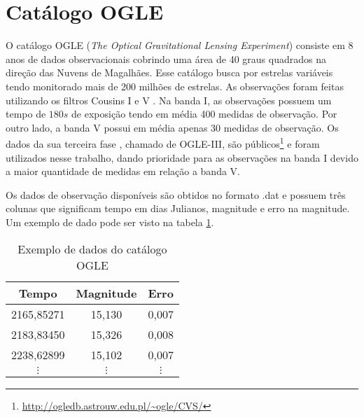 

\section{Catálogo OGLE}

O catálogo OGLE (\textit{The Optical Gravitational Lensing Experiment}) \citep{Udalski2008} consiste em 8 anos de dados observacionais cobrindo uma área de 40 graus quadrados na direção das Nuvens de Magalhães. Esse catálogo busca por estrelas variáveis tendo monitorado mais de 200 milhões de estrelas. As observações foram feitas utilizando os filtros Cousins I e V \citep{Cousins1973}. Na banda I, as observações possuem um tempo de $180 \si{s}$ de exposição tendo em média 400 medidas de observação. Por outro lado, a banda V possui em média apenas 30 medidas de observação. Os dados da sua terceira fase \citep{Udalski2008}, chamado de OGLE-III, são públicos\footnote{\url{http://ogledb.astrouw.edu.pl/~ogle/CVS/}} e foram utilizados nesse trabalho, dando prioridade para as observações na banda I devido a maior quantidade de medidas em relação a banda V.

Os dados de observação disponíveis são obtidos no formato .dat e possuem três colunas que significam tempo em dias Julianos, magnitude e erro na magnitude. Um exemplo de dado pode ser visto na tabela \ref{tab:dados}.

\begin{table}
\begin{center}
\caption{Exemplo de dados do catálogo OGLE}
\begin{tabular}{c|c|c}
\toprule
Tempo & Magnitude & Erro \\
\midrule
2165,85271 & 15,130 & 0,007 \\
2183,83450 & 15,326 & 0,008 \\
2238,62899 & 15,102 & 0,007 \\
$\vdots$ & $\vdots$ & $\vdots$ \\
\bottomrule
\end{tabular}
\label{tab:dados}
\end{center}
\end{table}

